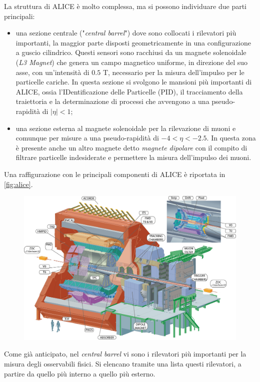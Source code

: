 La struttura di ALICE è molto complessa, ma si possono individuare due parti principali:
\begin{itemize}
    \item una sezione centrale ("\emph{central barrel}") dove sono collocati i rilevatori più importanti, la maggior parte disposti geometricamente in una configurazione a guscio cilindrico.
    Questi sensori sono racchiusi da un magnete solenoidale (\emph{L3 Magnet}) che genera un campo magnetico uniforme, in direzione del suo asse, con un'intensità di $0.5$ T, necessario per la misura dell'impulso per le particelle cariche.
    In questa sezione si svolgono le mansioni più importanti di ALICE, ossia l'IDentificazione delle Particelle (PID), il tracciamento della traiettoria e la determinazione di processi che avvengono a una pseudo-rapidità di $|\eta| < 1$;
    \item una sezione esterna al magnete solenoidale per la rilevazione di muoni e comunque per misure a una pseudo-rapidità di $-4<\eta<-2.5$.
    In questa zona è presente anche un altro magnete detto \emph{magnete dipolare} con il compito di filtrare particelle indesiderate e permettere la misura dell'impulso dei muoni.
\end{itemize}
Una raffigurazione con le principali componenti di ALICE è riportata in \autoref{fig:alice}.

\begin{figure}[htb]
    \centering
    \includegraphics[width=\textwidth]{image/1-alice/alice.jpg}
    \label{fig:alice}
\end{figure}
Come già anticipato, nel \textit{central barrel} vi sono i rilevatori più importanti per la misura degli osservabili fisici.
Si elencano tramite una lista questi rilevatori, a partire da quello più interno a quello più esterno.

